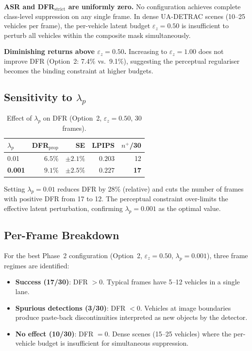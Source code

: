 \documentclass[12pt,a4paper]{report}
\begin{document}
\textbf{ASR and DFR$_{\text{strict}}$ are uniformly zero.}
No configuration achieves complete class-level suppression on any single frame.
In dense UA-DETRAC scenes (10--25 vehicles per frame), the per-vehicle latent budget
$\varepsilon_z = 0.50$ is insufficient to perturb all vehicles within the composite
mask simultaneously.

\textbf{Diminishing returns above $\varepsilon_z = 0.50$.}
Increasing to $\varepsilon_z = 1.00$ does not improve DFR (Option~2: 7.4\% vs.\ 9.1\%),
suggesting the perceptual regulariser becomes the binding constraint at higher budgets.

\subsection{Sensitivity to \texorpdfstring{$\lambda_p$}{lambda\_p}}
\label{sec:lambda_abl}

\begin{table}[htbp]
  \centering
  \caption{Effect of $\lambda_p$ on DFR (Option~2, $\varepsilon_z=0.50$, 30 frames).}
  \label{tab:lambda_abl}
  \begin{tabular}{@{}lrrrr@{}}
    \toprule
    $\lambda_p$ & DFR$_{\text{prop}}$ & SE & LPIPS & $n^+$/30 \\
    \midrule
    0.01  & $6.5\%$ & $\pm2.1\%$ & $0.203$ & 12 \\
    \textbf{0.001} & $\mathbf{9.1\%}$ & $\mathbf{\pm2.5\%}$ & $0.227$ & \textbf{17} \\
    \bottomrule
  \end{tabular}
\end{table}

Setting $\lambda_p = 0.01$ reduces DFR by 28\% (relative) and cuts the number of
frames with positive DFR from 17 to 12. The perceptual constraint over-limits the
effective latent perturbation, confirming $\lambda_p = 0.001$ as the optimal value.



\subsection{Per-Frame Breakdown}
\label{sec:per_frame}



For the best Phase~2 configuration (Option~2, $\varepsilon_z=0.50$, $\lambda_p=0.001$),
three frame regimes are identified:

\begin{itemize}[itemsep=3pt]
  \item \textbf{Success (17/30)}: DFR $> 0$. Typical frames have 5--12 vehicles in a single lane.
  \item \textbf{Spurious detections (3/30)}: DFR $< 0$. Vehicles at image boundaries produce
    paste-back discontinuities interpreted as new objects by the detector.
  \item \textbf{No effect (10/30)}: DFR $= 0$. Dense scenes (15--25 vehicles) where the
    per-vehicle budget is insufficient for simultaneous suppression.
\end{itemize}
\end{document}
